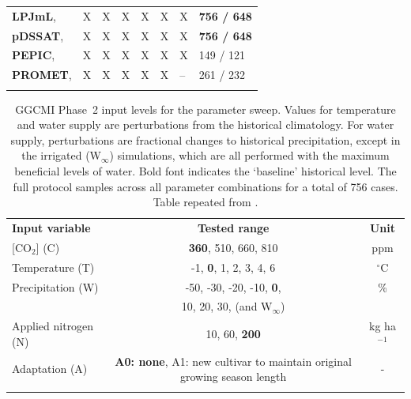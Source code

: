 \documentclass[gmdd]{copernicus} %
\begin{document}
\begin{table}[ht]
\begin{tabular}{p{6cm} p{1cm} p{1cm} p{1cm} p{1cm} p{1cm} p{1cm} p{1.9cm}}
        \textbf{LPJmL},     \citet{von_Bloh_implementing_2018} & X & X & X & X & X & X & \textbf{756 / 648}\\ \middlehline
        \textbf{pDSSAT},    \citet{Elliott2014b, JONES2003235} & X & X & X & X & X & X & \textbf{756 / 648}\\ \middlehline
        \textbf{PEPIC},     \citet{LIU2016164, LIU2016}        & X & X & X & X & X & X & 149 / 121\\ \middlehline
        \textbf{PROMET},    \citet{Hank2015, MAUSER2015, Zabel2019}  & X & X & X & X & X & -- & 261 / 232\\
        \bottomhline
    \end{tabular}
\end{table}

\begin{table}[ht]
    \caption{
    GGCMI Phase~2 input levels for the parameter sweep. 
    Values for temperature and water supply are perturbations from the historical climatology. 
    For water supply, perturbations are fractional changes to historical precipitation, except in the irrigated (W$_{\infty}$) simulations, which are all performed with the maximum beneficial levels of water. 
    Bold font indicates the `baseline' historical level. 
    The full protocol samples across all parameter combinations for a total of 756 cases.
    Table repeated from \citet{franke2020ctwnexperiment}.
    }
    \label{table:inputs} 
    \begin{tabular}{lcc} 
        \tophline \vspace{1mm}
        \textbf{Input variable} & \textbf{Tested range} & \textbf{Unit} \\ \middlehline \vspace{1mm}
        [CO$_2$] (C) & \textbf{360}, 510, 660, 810 & ppm\\ \middlehline \vspace{1mm}
        Temperature (T) & -1, \textbf{0}, 1, 2, 3, 4, 6 & $^{\circ}$C\\ \middlehline \vspace{1mm}
        Precipitation (W) & -50, -30, -20, -10, \textbf{0}, & \% \\
        {} & 10, 20, 30, (and W$_{\infty}$) & {} \\ \middlehline \vspace{1mm}
        Applied nitrogen (N) & 10, 60, \textbf{200} & kg ha$^{-1}$ \\ \middlehline \vspace{1mm}
        Adaptation (A) & \textbf{A0: none}, A1: new cultivar to maintain original growing season length & -\\ \bottomhline
    \end{tabular}\\
\end{table}
\end{document}
